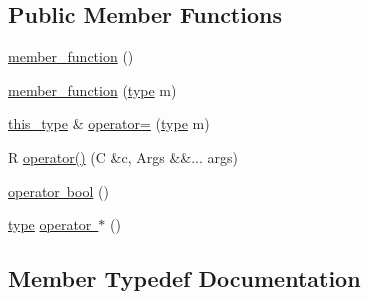 \subsection*{Public Member Functions}
\begin{DoxyCompactItemize}
\item 
\mbox{\hyperlink{classfakeit_1_1member__function_3_01C_00_01R_07Args_8_8_8_08_4_a9ca61cf0bccaebeb9a02fb757878ce0d}{member\+\_\+function}} ()
\item 
\mbox{\hyperlink{classfakeit_1_1member__function_3_01C_00_01R_07Args_8_8_8_08_4_af27ea1a8bfabd755cfe8baab03317d79}{member\+\_\+function}} (\mbox{\hyperlink{classfakeit_1_1member__function_3_01C_00_01R_07Args_8_8_8_08_4_a21761d9e5d16d880e677d266fc331aaa}{type}} m)
\item 
\mbox{\hyperlink{classfakeit_1_1member__function_3_01C_00_01R_07Args_8_8_8_08_4_a2f0619303f6394749b3d110408a6945a}{this\+\_\+type}} \& \mbox{\hyperlink{classfakeit_1_1member__function_3_01C_00_01R_07Args_8_8_8_08_4_ab1241ada2652994eae30c8bf0f2cc5aa}{operator=}} (\mbox{\hyperlink{classfakeit_1_1member__function_3_01C_00_01R_07Args_8_8_8_08_4_a21761d9e5d16d880e677d266fc331aaa}{type}} m)
\item 
R \mbox{\hyperlink{classfakeit_1_1member__function_3_01C_00_01R_07Args_8_8_8_08_4_a2c1d2dc93f029885569976989a0f49fd}{operator()}} (C \&c, Args \&\&... args)
\item 
\mbox{\hyperlink{classfakeit_1_1member__function_3_01C_00_01R_07Args_8_8_8_08_4_a5f3b049a9bd0e8171f86db4fab5f4e5f}{operator bool}} ()
\item 
\mbox{\hyperlink{classfakeit_1_1member__function_3_01C_00_01R_07Args_8_8_8_08_4_a21761d9e5d16d880e677d266fc331aaa}{type}} \mbox{\hyperlink{classfakeit_1_1member__function_3_01C_00_01R_07Args_8_8_8_08_4_a81ecf7365097bf973b5496efa6c6e6db}{operator $\ast$}} ()
\end{DoxyCompactItemize}


\subsection{Member Typedef Documentation}
\mbox{\label{classfakeit_1_1member__function_3_01C_00_01R_07Args_8_8_8_08_4_adec3af2f7a23e90ba69d1e7d65369908}} 
